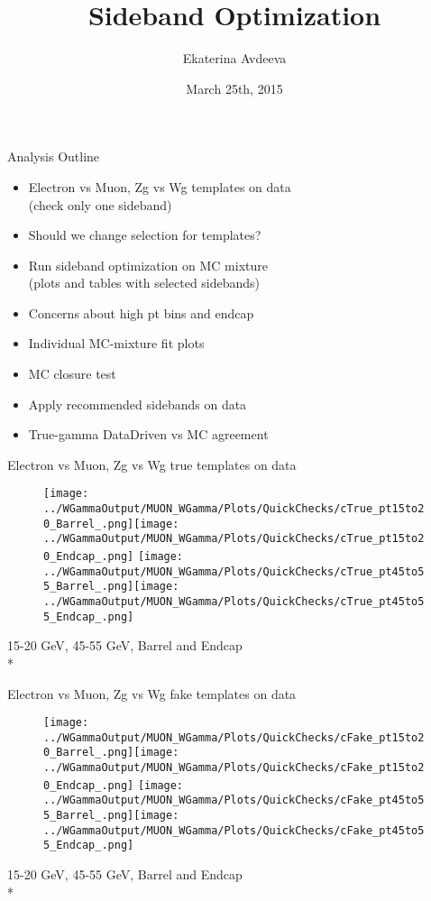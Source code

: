 \documentclass{beamer}
\title{Sideband Optimization}
\author{Ekaterina Avdeeva}
\institute{University of Nebraska - Lincoln}
\date{March 25th, 2015}
\begin{document}
\begin{frame}
\titlepage
\end{frame}

\begin{frame}{Analysis Outline}
{
  \begin{itemize}
  \item Electron vs Muon, Zg vs Wg templates on data \\
   (check only one sideband)
  \item Should we change selection for templates?
  \item Run sideband optimization on MC mixture \\
   (plots and tables with selected sidebands)
  \item Concerns about high pt bins and endcap
  \item Individual MC-mixture fit plots
  \item MC closure test
  \item Apply recommended sidebands on data
  \item True-gamma DataDriven vs MC agreement
  \end{itemize}
}
\end{frame}


\begin{frame}{Electron vs Muon, Zg vs Wg true templates on data}
  \begin{figure}
    \centering
    \texttt{[image: ../WGammaOutput/MUON\_WGamma/Plots/QuickChecks/cTrue\_pt15to20\_Barrel\_.png]}\texttt{[image: ../WGammaOutput/MUON\_WGamma/Plots/QuickChecks/cTrue\_pt15to20\_Endcap\_.png]}
    \texttt{[image: ../WGammaOutput/MUON\_WGamma/Plots/QuickChecks/cTrue\_pt45to55\_Barrel\_.png]}\texttt{[image: ../WGammaOutput/MUON\_WGamma/Plots/QuickChecks/cTrue\_pt45to55\_Endcap\_.png]}
    \end{figure}
  \scriptsize 15-20 GeV, 45-55 GeV, Barrel and Endcap\\*
\end{frame}

\begin{frame}{Electron vs Muon, Zg vs Wg fake templates on data}
  \begin{figure}
    \centering
    \texttt{[image: ../WGammaOutput/MUON\_WGamma/Plots/QuickChecks/cFake\_pt15to20\_Barrel\_.png]}\texttt{[image: ../WGammaOutput/MUON\_WGamma/Plots/QuickChecks/cFake\_pt15to20\_Endcap\_.png]}
    \texttt{[image: ../WGammaOutput/MUON\_WGamma/Plots/QuickChecks/cFake\_pt45to55\_Barrel\_.png]}\texttt{[image: ../WGammaOutput/MUON\_WGamma/Plots/QuickChecks/cFake\_pt45to55\_Endcap\_.png]}
    \end{figure}
  \scriptsize 15-20 GeV, 45-55 GeV, Barrel and Endcap\\*
\end{frame}
\end{document}
